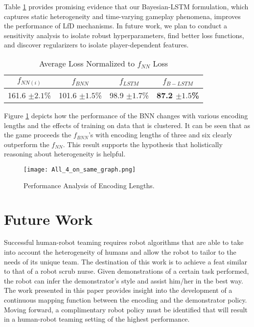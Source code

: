 \documentclass[conference]{IEEEtran}
\begin{document}
\par Table \ref{tal} provides promising evidence that our Bayesian-LSTM formulation, which captures static heterogeneity and time-varying gameplay phenomena, improves the performance of LfD mechanisms. In future work, we plan to conduct a sensitivity analysis to isolate robust hyperparameters, find better loss functions, and discover regularizers to isolate player-dependent features. 



\begin{table}[h!]
\centering
\begin{tabular}{|c|c|c|c|}
\hline
$f_{NN(i)}$ & $f_{BNN}$ & $f_{LSTM}$ & $f_{B-LSTM}$ \\ \hline
 161.6 $\pm 2.1$\%   & 101.6 $\pm 1.5$\%   & 98.9  $\pm 1.7$\%   & \bf{87.2}  $\pm 1.5$\%      \\ \hline
\end{tabular}
\title{}
  \caption{Average Loss Normalized to $f_{NN}$ Loss}
  \label{tal}
\end{table}

\par Figure \ref{fig:method} depicts how the performance of the BNN changes with various encoding lengths and the effects of training on data that is clustered. It can be seen that as the game proceeds the $f_{BNN}$'s with encoding lengths of three and six clearly outperform the $f_{NN}$. This result supports the hypothesis that holistically reasoning about heterogeneity is helpful.

\begin{figure}[h!]
	\centering
	\texttt{[image: All\_4\_on\_same\_graph.png]}
	\caption{Performance Analysis of Encoding Lengths.}
	\label{fig:method}
\end{figure}

\section{Future Work}
\par Successful human-robot teaming requires robot algorithms that are able to take into account the heterogeneity of humans and allow the robot to tailor to the needs of its unique team. The destination of this work is to achieve a feat similar to that of a robot scrub nurse. Given demonstrations of a certain task performed, the robot can infer the demonstrator's style and assist him/her in the best way. The work presented in this paper provides insight into the development of a continuous mapping function between the encoding and the demonstrator policy. Moving forward, a complimentary robot policy must be identified that will result in a human-robot teaming setting of the highest performance.
\end{document}
